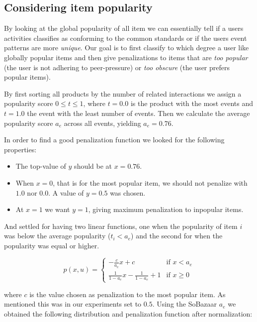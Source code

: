 \subsection{Considering item popularity}

By looking at the global popularity of all item we can essentially tell if a
users activities classifies as conforming to the common standards or if the
users event patterns are more \textit{unique}. Our goal is to first classify to
which degree a user like globally popular items and then give penalizations to
items that are \textit{too popular} (the user is not adhering to peer-pressure)
or \textit{too obscure} (the user prefers popular items).

By first sorting all products by the number of related interactions we assign
a popularity score $0 \leq t \leq 1$, where $t=0.0$ is the product with the most
events and $t=1.0$ the event with the least number of events. Then we calculate
the average popularity score $a_e$ across all events, yielding $a_e = 0.76$.

In order to find a good penalization function we looked for the following
properties:

\begin{itemize}
  \item The top-value of $y$ should be at $x = 0.76$.
  \item When $x = 0$, that is for the most popular item, we should not penalize
  with $1.0$ nor $0.0$. A value of $y = 0.5$ was chosen.
  \item At $x = 1$ we want $y = 1$, giving maximum penalization to
  inpopular items.
\end{itemize}

And settled for having two linear functions, one when the popularity of item
$i$ was below the average popularity ($t_i < a_e$) and the second for when the
popularity was equal or higher.

\begin{equation}
  p(x, u) =
    \begin{cases}
      -\frac{c}{a_e}x + c                     & \text{if } x < a_e \\[1.5ex]
      \frac{1}{1-a_e}x - \frac{1}{1-a_e} + 1  & \text{if } x \geq 0
    \end{cases}
\end{equation}

where $c$ is the value chosen as penalization to the most popular item. As
mentioned this was in our experiments set to $0.5$. Using the SoBazaar $a_e$ we
obtained the following distribution and penalization function after
normalization:

